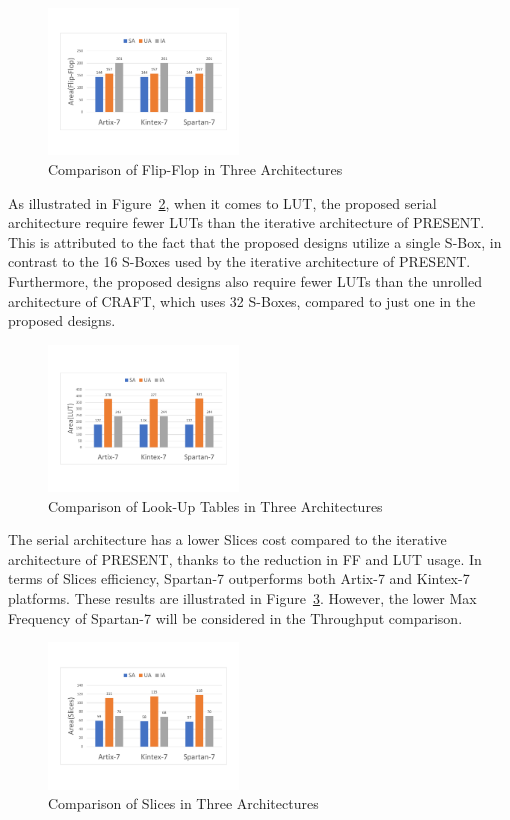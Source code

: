 \documentclass[final,5p,times,twocolumn]{elsarticle}
\begin{document}
\begin{figure}
    \centering
    \includegraphics[width=0.45\textwidth]{./fig/compare-ff.pdf}
    \caption{Comparison of Flip-Flop in Three Architectures}\label{compare_ff}
\end{figure}

As illustrated in Figure~\ref{compare_lut}, when it comes to LUT, the proposed serial architecture require fewer LUTs than the iterative architecture of PRESENT. This is attributed to the fact that the proposed designs utilize a single S-Box, in contrast to the 16 S-Boxes used by the iterative architecture of PRESENT. Furthermore, the proposed designs also require fewer LUTs than the unrolled architecture of CRAFT, which uses 32 S-Boxes, compared to just one in the proposed designs.

\begin{figure}
    \centering
    \includegraphics[width=0.45\textwidth]{./fig/compare-lut.pdf}
    \caption{Comparison of Look-Up Tables in Three Architectures}\label{compare_lut}
\end{figure}

The serial architecture has a lower Slices cost compared to the iterative architecture of PRESENT, thanks to the reduction in FF and LUT usage.
In terms of Slices efficiency, Spartan-7 outperforms both Artix-7 and Kintex-7 platforms.
These results are illustrated in Figure~\ref{compare-slices}. However, the lower Max Frequency of Spartan-7 will be considered in the Throughput comparison.

\begin{figure}
    \centering
    \includegraphics[width=0.45\textwidth]{./fig/compare-slices.pdf}
    \caption{Comparison of Slices in Three Architectures}\label{compare-slices}
\end{figure}
\end{document}
